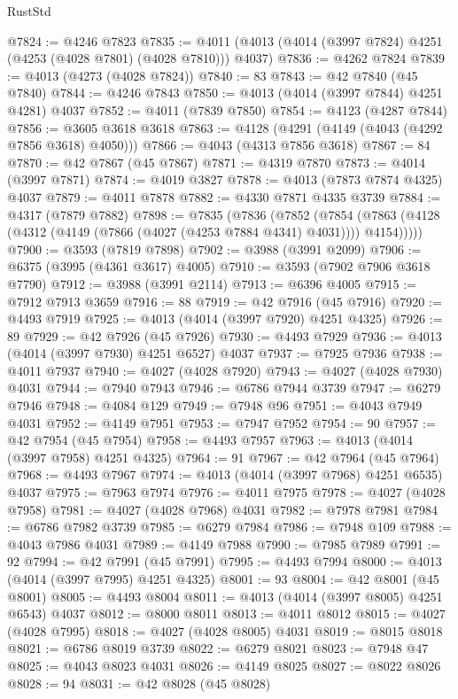 \begin{lexlean}{RustStd}
\begin{coremodule}
@7824 := @4246 @7823
@7835 := @4011 (@4013 (@4014 (@3997 @7824) @4251 (@4253 (@4028 @7801) (@4028 @7810))) @4037)
@7836 := @4262 @7824
@7839 := @4013 (@4273 (@4028 @7824))
@7840 := 83
@7843 := @42 @7840 (@45 @7840)
@7844 := @4246 @7843
@7850 := @4013 (@4014 (@3997 @7844) @4251 @4281) @4037
@7852 := @4011 (@7839 @7850)
@7854 := @4123 (@4287 @7844)
@7856 := @3605 @3618 @3618
@7863 := @4128 (@4291 (@4149 (@4043 (@4292 @7856 @3618) @4050)))
@7866 := @4043 (@4313 @7856 @3618)
@7867 := 84
@7870 := @42 @7867 (@45 @7867)
@7871 := @4319 @7870
@7873 := @4014 (@3997 @7871)
@7874 := @4019 @3827
@7878 := @4013 (@7873 @7874 @4325) @4037
@7879 := @4011 @7878
@7882 := @4330 @7871 @4335 @3739
@7884 := @4317 (@7879 @7882)
@7898 := @7835
    (@7836
      (@7852
        (@7854 (@7863 (@4128 (@4312 (@4149 (@7866 (@4027 (@4253 @7884 @4341) @4031)))) @4154)))))
@7900 := @3593 (@7819 @7898)
@7902 := @3988 (@3991 @2099)
@7906 := @6375 (@3995 (@4361 @3617) @4005)
@7910 := @3593 (@7902 @7906 @3618 @7790)
@7912 := @3988 (@3991 @2114)
@7913 := @6396 @4005
@7915 := @7912 @7913 @3659
@7916 := 88
@7919 := @42 @7916 (@45 @7916)
@7920 := @4493 @7919
@7925 := @4013 (@4014 (@3997 @7920) @4251 @4325)
@7926 := 89
@7929 := @42 @7926 (@45 @7926)
@7930 := @4493 @7929
@7936 := @4013 (@4014 (@3997 @7930) @4251 @6527) @4037
@7937 := @7925 @7936
@7938 := @4011 @7937
@7940 := @4027 (@4028 @7920)
@7943 := @4027 (@4028 @7930) @4031
@7944 := @7940 @7943
@7946 := @6786 @7944 @3739
@7947 := @6279 @7946
@7948 := @4084 @129
@7949 := @7948 @96
@7951 := @4043 @7949 @4031
@7952 := @4149 @7951
@7953 := @7947 @7952
@7954 := 90
@7957 := @42 @7954 (@45 @7954)
@7958 := @4493 @7957
@7963 := @4013 (@4014 (@3997 @7958) @4251 @4325)
@7964 := 91
@7967 := @42 @7964 (@45 @7964)
@7968 := @4493 @7967
@7974 := @4013 (@4014 (@3997 @7968) @4251 @6535) @4037
@7975 := @7963 @7974
@7976 := @4011 @7975
@7978 := @4027 (@4028 @7958)
@7981 := @4027 (@4028 @7968) @4031
@7982 := @7978 @7981
@7984 := @6786 @7982 @3739
@7985 := @6279 @7984
@7986 := @7948 @109
@7988 := @4043 @7986 @4031
@7989 := @4149 @7988
@7990 := @7985 @7989
@7991 := 92
@7994 := @42 @7991 (@45 @7991)
@7995 := @4493 @7994
@8000 := @4013 (@4014 (@3997 @7995) @4251 @4325)
@8001 := 93
@8004 := @42 @8001 (@45 @8001)
@8005 := @4493 @8004
@8011 := @4013 (@4014 (@3997 @8005) @4251 @6543) @4037
@8012 := @8000 @8011
@8013 := @4011 @8012
@8015 := @4027 (@4028 @7995)
@8018 := @4027 (@4028 @8005) @4031
@8019 := @8015 @8018
@8021 := @6786 @8019 @3739
@8022 := @6279 @8021
@8023 := @7948 @47
@8025 := @4043 @8023 @4031
@8026 := @4149 @8025
@8027 := @8022 @8026
@8028 := 94
@8031 := @42 @8028 (@45 @8028)

\end{coremodule}
\end{lexlean}
